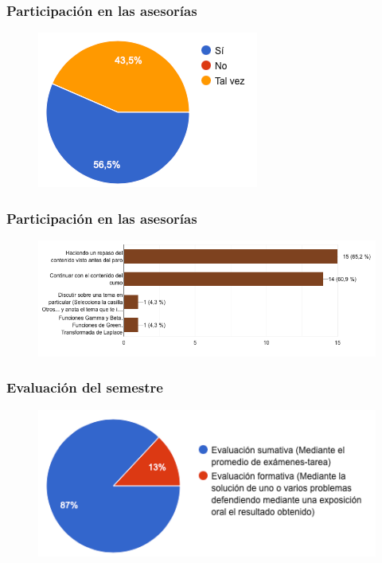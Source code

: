 \begin{frame}
\frametitle{Participación en las asesorías}
\begin{figure}
    \centering
    \includegraphics[scale=0.8]{Imagenes/Encuesta_Asesorias_03.png}
\end{figure}
\end{frame}
\begin{frame}
\frametitle{Participación en las asesorías}
\begin{figure}
    \hspace*{-0.4cm}
    \centering
    \includegraphics[scale=0.45]{Imagenes/Encuesta_Asesorias_04.png}
\end{figure}
\end{frame}
\begin{frame}
\frametitle{Evaluación del semestre}
\begin{figure}
    \centering
    \includegraphics[scale=0.7]{Imagenes/Encuesta_Asesorias_05.png}
\end{figure}
\end{frame}

